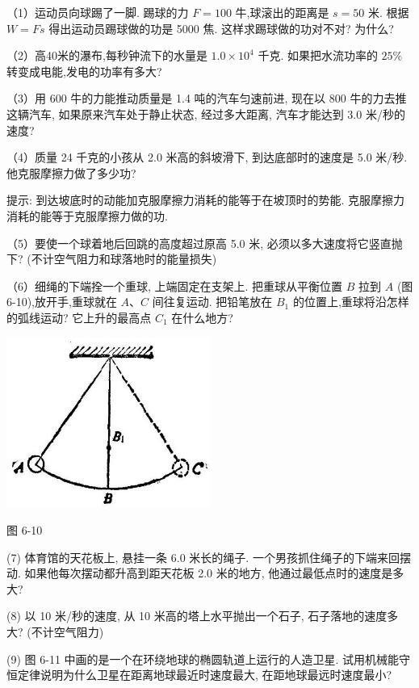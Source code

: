 \documentclass[10pt]{article}
\begin{document}
（1）运动员向球踢了一脚. 踢球的力 \(F = {100}\) 牛,球滚出的距离是 \(s = {50}\) 米. 根据 \(W = {Fs}\) 得出运动员踢球做的功是 5000 焦. 这样求踢球做的功对不对? 为什么?

（2）高40米的瀑布,每秒钟流下的水量是 \({1.0} \times {10}^{4}\) 千克. 如果把水流功率的 \({25}\%\) 转变成电能,发电的功率有多大?

（3）用 600 牛的力能推动质量是 1.4 吨的汽车匀速前进, 现在以 800 牛的力去推这辆汽车, 如果原来汽车处于静止状态, 经过多大距离, 汽车才能达到 3.0 米/秒的速度?

（4）质量 24 千克的小孩从 2.0 米高的斜坡滑下, 到达底部时的速度是 5.0 米/秒. 他克服摩擦力做了多少功?

提示: 到达坡底时的动能加克服摩擦力消耗的能等于在坡顶时的势能. 克服摩擦力消耗的能等于克服摩擦力做的功.

（5）要使一个球着地后回跳的高度超过原高 5.0 米, 必须以多大速度将它竖直抛下? (不计空气阻力和球落地时的能量损失)

（6）细绳的下端拴一个重球, 上端固定在支架上. 把重球从平衡位置 \(B\) 拉到 \(A\) (图 6-10),放开手,重球就在 \(A\text{、}C\) 间往复运动. 把铅笔放在 \({B}_{1}\) 的位置上,重球将沿怎样的弧线运动? 它上升的最高点 \({C}_{1}\) 在什么地方?

\begin{center}
\includegraphics[max width=0.5\textwidth]{images/01912d55-147c-70aa-b0e0-1782a122f948_189_604544.jpg}
\end{center}

图 6-10

(7) 体育馆的天花板上, 悬挂一条 6.0 米长的绳子. 一个男孩抓住绳子的下端来回摆动. 如果他每次摆动都升高到距天花板 2.0 米的地方, 他通过最低点时的速度是多大?

(8) 以 10 米/秒的速度, 从 10 米高的塔上水平抛出一个石子, 石子落地的速度多大? (不计空气阻力)

(9) 图 6-11 中画的是一个在环绕地球的椭圆轨道上运行的人造卫星. 试用机械能守恒定律说明为什么卫星在距离地球最近时速度最大, 在距地球最远时速度最小?
\end{document}
